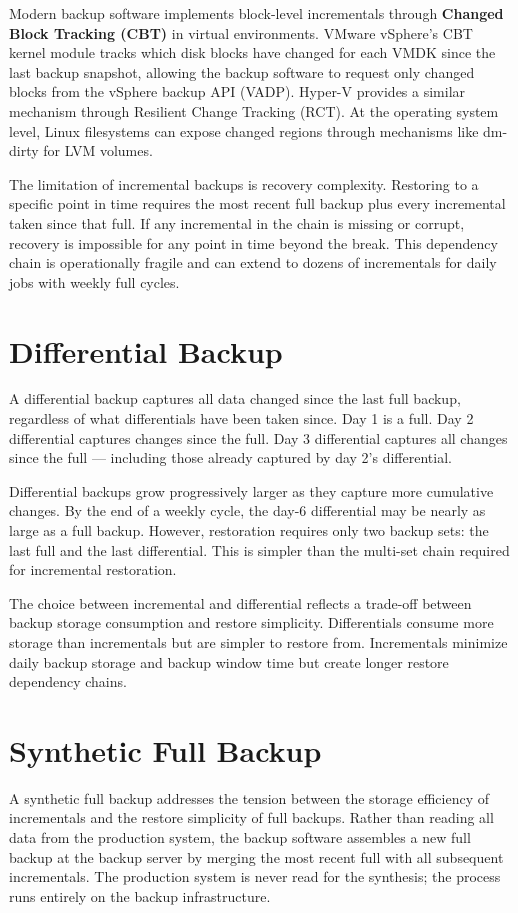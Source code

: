 Modern backup software implements block-level incrementals through \textbf{Changed Block Tracking (CBT)} in virtual environments. VMware vSphere's CBT kernel module tracks which disk blocks have changed for each VMDK since the last backup snapshot, allowing the backup software to request only changed blocks from the vSphere backup API (VADP). Hyper-V provides a similar mechanism through Resilient Change Tracking (RCT). At the operating system level, Linux filesystems can expose changed regions through mechanisms like dm-dirty for LVM volumes.

The limitation of incremental backups is recovery complexity. Restoring to a specific point in time requires the most recent full backup plus every incremental taken since that full. If any incremental in the chain is missing or corrupt, recovery is impossible for any point in time beyond the break. This dependency chain is operationally fragile and can extend to dozens of incrementals for daily jobs with weekly full cycles.

\section{Differential Backup}
A differential backup captures all data changed since the last full backup, regardless of what differentials have been taken since. Day 1 is a full. Day 2 differential captures changes since the full. Day 3 differential captures all changes since the full --- including those already captured by day 2's differential.

Differential backups grow progressively larger as they capture more cumulative changes. By the end of a weekly cycle, the day-6 differential may be nearly as large as a full backup. However, restoration requires only two backup sets: the last full and the last differential. This is simpler than the multi-set chain required for incremental restoration.

The choice between incremental and differential reflects a trade-off between backup storage consumption and restore simplicity. Differentials consume more storage than incrementals but are simpler to restore from. Incrementals minimize daily backup storage and backup window time but create longer restore dependency chains.

\section{Synthetic Full Backup}
A synthetic full backup addresses the tension between the storage efficiency of incrementals and the restore simplicity of full backups. Rather than reading all data from the production system, the backup software assembles a new full backup at the backup server by merging the most recent full with all subsequent incrementals. The production system is never read for the synthesis; the process runs entirely on the backup infrastructure.

